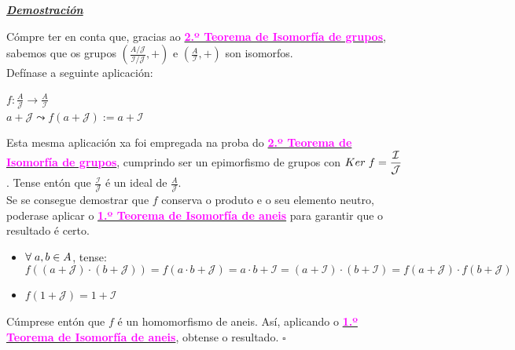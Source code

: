 \documentclass[twoside]{report}
\newcommand{\magbf}[1]{\textcolor{magenta}{\textbf{#1}}} %
\theoremstyle{mystyle}
\begin{document}
\vspace{2mm}

\noindent \textbf{\textit{\underline{Demostración}}}

\vspace{2mm}

\noindent Cómpre ter en conta que, gracias ao \hyperref[th1.6]{\magbf{2.º Teorema de Isomorfía de grupos}}, sabemos que os grupos $\left ( \displaystyle \frac{A/\mathcal{J}}{\mathcal{I}/\mathcal{J}}, + \right )$ e $\left ( \displaystyle \frac{A}{\mathcal{I}}, + \right )$ son isomorfos.\\

\noindent Defínase a seguinte aplicación:

\begin{center}
$ f: \displaystyle \frac{A}{\mathcal{J}} \longrightarrow \displaystyle \frac{A}{\mathcal{I}}$\\
\vspace{3mm}
\hspace{25mm} $a + \mathcal{J} \leadsto f(a + \mathcal{J}) := a + \mathcal{I}$\\
\end{center}

\noindent Esta mesma aplicación xa foi empregada na proba do \hyperref[th1.6]{\magbf{2.º Teorema de Isomorfía de grupos}}, cumprindo ser un epimorfismo de grupos con $Ker \hspace{1mm} f = \displaystyle \frac{\mathcal{I}}{\mathcal{J}}$. Tense entón que $\displaystyle \frac{\mathcal{I}}{\mathcal{J}}$ é un ideal de $\displaystyle \frac{A}{\mathcal{J}}$.\\

\noindent Se se consegue demostrar que $f$ conserva o produto e o seu elemento neutro, poderase aplicar o \hyperref[th2.1]{\magbf{1.º Teorema de Isomorfía de aneis}} para garantir que o resultado é certo.

\begin{itemize}
    \item $\forall \hspace{1mm} a,b \in A$, tense:
    $$f((a + \mathcal{J}) \cdot (b + \mathcal{J})) = f(a \cdot b + \mathcal{J}) = a \cdot b + \mathcal{I} = (a + \mathcal{I}) \cdot (b + \mathcal{I}) = f(a + \mathcal{J}) \cdot f(b + \mathcal{J})$$
    
    \item $f(1 + \mathcal{J}) = 1 + \mathcal{I}$
\end{itemize}

\noindent Cúmprese entón que $f$ é un homomorfismo de aneis. Así, aplicando o \hyperref[th2.1]{\magbf{1.º Teorema de Isomorfía de aneis}}, obtense o resultado. $\square$\\
\end{document}
